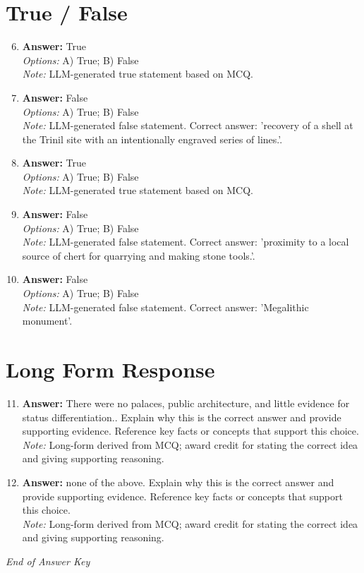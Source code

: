 \documentclass[12pt]{article}
\begin{document}
\section*{True / False}
\begin{enumerate}[label=\arabic*.]
\setcounter{enumi}{5}
\item \textbf{Answer:} True
\\ \textit{Options:} A) True; B) False
\\ \textit{Note:} LLM-generated true statement based on MCQ.
\item \textbf{Answer:} False
\\ \textit{Options:} A) True; B) False
\\ \textit{Note:} LLM-generated false statement. Correct answer: 'recovery of a shell at the Trinil site with an intentionally engraved series of lines.'.
\item \textbf{Answer:} True
\\ \textit{Options:} A) True; B) False
\\ \textit{Note:} LLM-generated true statement based on MCQ.
\item \textbf{Answer:} False
\\ \textit{Options:} A) True; B) False
\\ \textit{Note:} LLM-generated false statement. Correct answer: 'proximity to a local source of chert for quarrying and making stone tools.'.
\item \textbf{Answer:} False
\\ \textit{Options:} A) True; B) False
\\ \textit{Note:} LLM-generated false statement. Correct answer: 'Megalithic monument'.
\end{enumerate}

\section*{Long Form Response}
\begin{enumerate}[label=\arabic*.]
\setcounter{enumi}{10}
\item \textbf{Answer:} There were no palaces, public architecture, and little evidence for status differentiation.. Explain why this is the correct answer and provide supporting evidence. Reference key facts or concepts that support this choice.
\\ \textit{Note:} Long-form derived from MCQ; award credit for stating the correct idea and giving supporting reasoning.
\item \textbf{Answer:} none of the above. Explain why this is the correct answer and provide supporting evidence. Reference key facts or concepts that support this choice.
\\ \textit{Note:} Long-form derived from MCQ; award credit for stating the correct idea and giving supporting reasoning.
\end{enumerate}

\vfill
\noindent\textit{End of Answer Key}
\end{document}
